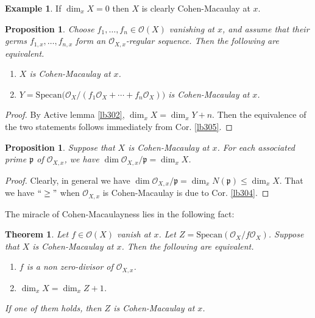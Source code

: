 \documentclass[12pt,b5paper,notitlepage]{report}
\theoremstyle{definition}
\newtheorem{eg}[df]{Example}
\theoremstyle{plain}
\newtheorem{thm}[df]{Theorem}
\newtheorem{pp}[df]{Proposition}
\newcommand{\scr}{\mathscr}
\newcommand{\pk}{\mathfrak p}
\newcommand{\Specan}{\mathrm{Specan}}
\numberwithin{equation}{section}
\begin{document}
\begin{eg}
If $\dim_xX=0$ then $X$ is clearly Cohen-Macaulay at $x$.
\end{eg}



\begin{pp}\label{lb306}
Choose $f_1,\dots,f_n\in\scr O(X)$ vanishing at $x$, and assume that their germs $f_{1,x},\dots,f_{n,x}$ form an $\scr O_{X,x}$-regular sequence. Then the following are equivalent.
\begin{enumerate}[label=(\arabic*)]
\item $X$ is Cohen-Macaulay at $x$.
\item $Y=\Specan\big(\scr O_X/(f_1\scr O_X+\cdots+f_n\scr O_X)\big)$ is Cohen-Macaulay at $x$.
\end{enumerate}
\end{pp}


\begin{proof}
By Active lemma \ref{lb302}, $\dim_xX=\dim_xY+n$. Then the equivalence of the two statements follows immediately from Cor. \ref{lb305}.
\end{proof}



\begin{pp}\label{lb307}
Suppose that $X$ is Cohen-Macaulay at $x$. For each associated prime $\pk$ of $\scr O_{X,x}$, we have $\dim\scr O_{X,x}/\pk=\dim_xX$.
\end{pp}

\begin{proof}
Clearly, in general we have $\dim\scr O_{X,x}/\pk=\dim_x N(\pk)\leq\dim_xX$. That we have $``\geq"$ when $\scr O_{X,x}$ is Cohen-Macaulay is due to Cor. \ref{lb304}.
\end{proof}


The miracle of Cohen-Macaulayness lies in the following fact:



\begin{thm}\label{lb309}
Let $f\in\scr O(X)$ vanish at $x$. Let $Z=\Specan(\scr O_X/f\scr O_X)$. Suppose that $X$ is Cohen-Macaulay at $x$. Then the following are equivalent.
\begin{enumerate}[label=(\arabic*)]
\item $f$ is a non zero-divisor of $\scr O_{X,x}$.
\item $\dim_x X=\dim_x Z+1$.
\end{enumerate}
If one of them holds, then $Z$ is Cohen-Macaulay at $x$.
\end{thm}
\end{document}
